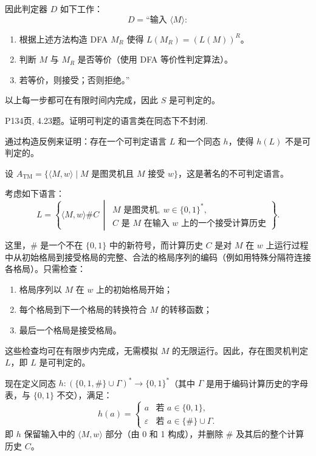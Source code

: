 \documentclass[11pt,addpoints,answers]{exam}
\begin{document}
\begin{questions}
\begin{solution}
        因此判定器 \(D\) 如下工作：
        \[
        D = \text{“输入 } \langle M \rangle:
        \]
        \begin{enumerate}
            \item 根据上述方法构造 DFA \(M_R\) 使得 \(L(M_R) = (L(M))^R\)。
            \item 判断 \(M\) 与 \(M_R\) 是否等价（使用 DFA 等价性判定算法）。
            \item 若等价，则接受；否则拒绝。”
        \end{enumerate}
        
        以上每一步都可在有限时间内完成，因此 \(S\) 是可判定的。
	\end{solution}  
	
	\question P134页, 4.23题。证明可判定的语言类在同态下不封闭.
	\begin{solution}
    
		通过构造反例来证明：存在一个可判定语言 $L$ 和一个同态 $h$，使得 $h(L)$ 不是可判定的。

        设 $A_{\text{TM}} = \{ \langle M, w \rangle \mid M \text{ 是图灵机且 } M \text{ 接受 } w \}$，这是著名的不可判定语言。
        
        考虑如下语言：
        \[
        L = \left\{ \langle M, w \rangle \# C \,\middle|\, 
        \begin{array}{l}
        M \text{ 是图灵机},\ w \in \{0,1\}^*, \\
        C \text{ 是 } M \text{ 在输入 } w \text{ 上的一个接受计算历史}
        \end{array}
        \right\}.
        \]
        
        这里，$\#$ 是一个不在 $\{0,1\}$ 中的新符号，而计算历史 $C$ 是对 $M$ 在 $w$ 上运行过程中从初始格局到接受格局的完整、合法的格局序列的编码（例如用特殊分隔符连接各格局）。只需检查：
        \begin{enumerate}
            \item 格局序列以 $M$ 在 $w$ 上的初始格局开始；
            \item 每个格局到下一个格局的转换符合 $M$ 的转移函数；
            \item 最后一个格局是接受格局。
        \end{enumerate}
        这些检查均可在有限步内完成，无需模拟 $M$ 的无限运行。因此，存在图灵机判定 $L$，即 $L$ 是可判定的。
        
        现在定义同态 $h: (\{0,1,\#\} \cup \Gamma)^* \to \{0,1\}^*$（其中 $\Gamma$ 是用于编码计算历史的字母表，与 $\{0,1\}$ 不交），满足：
        \[
        h(a) =
        \begin{cases}
        a & \text{若 } a \in \{0,1\}, \\
        \varepsilon & \text{若 } a \in \{\#\} \cup \Gamma.
        \end{cases}
        \]
        即 $h$ 保留输入中的 $\langle M, w \rangle$ 部分（由 0 和 1 构成），并删除 $\#$ 及其后的整个计算历史 $C$。
        

\end{solution}
\end{questions}
\end{document}
